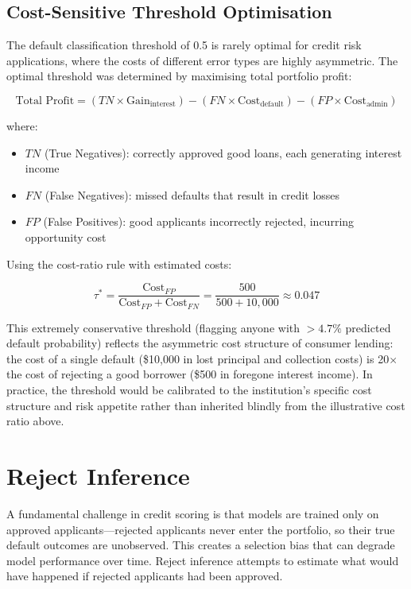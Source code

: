 \subsection{Cost-Sensitive Threshold Optimisation}

The default classification threshold of 0.5 is rarely optimal for credit risk applications, where the costs of different error types are highly asymmetric. The optimal threshold was determined by maximising total portfolio profit:

\begin{equation}
\text{Total Profit} = (TN \times \text{Gain}_{\text{interest}}) - (FN \times \text{Cost}_{\text{default}}) - (FP \times \text{Cost}_{\text{admin}})
\label{eq:profit_scoring}
\end{equation}

where:
\begin{itemize}
    \item $TN$ (True Negatives): correctly approved good loans, each generating interest income
    \item $FN$ (False Negatives): missed defaults that result in credit losses
    \item $FP$ (False Positives): good applicants incorrectly rejected, incurring opportunity cost
\end{itemize}

Using the cost-ratio rule with estimated costs:

\begin{equation}
\tau^* = \frac{\text{Cost}_{FP}}{\text{Cost}_{FP} + \text{Cost}_{FN}} = \frac{500}{500 + 10{,}000} \approx 0.047
\label{eq:threshold_scoring}
\end{equation}

This extremely conservative threshold (flagging anyone with $>4.7\%$ predicted default probability) reflects the asymmetric cost structure of consumer lending: the cost of a single default (\$10,000 in lost principal and collection costs) is 20$\times$ the cost of rejecting a good borrower (\$500 in foregone interest income). In practice, the threshold would be calibrated to the institution's specific cost structure and risk appetite rather than inherited blindly from the illustrative cost ratio above.


\section{Reject Inference}
\label{sec:reject_inference}

A fundamental challenge in credit scoring is that models are trained only on approved applicants---rejected applicants never enter the portfolio, so their true default outcomes are unobserved. This creates a selection bias that can degrade model performance over time. Reject inference attempts to estimate what would have happened if rejected applicants had been approved.

